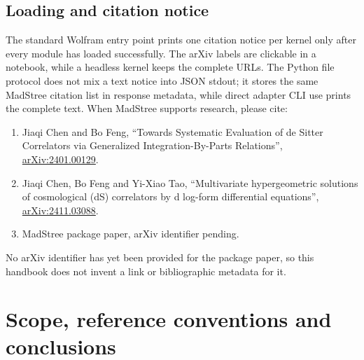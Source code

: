 \documentclass[11pt,a4paper]{article}
\begin{document}
\subsection{Loading and citation notice}

The standard Wolfram entry point prints one citation notice per kernel only after every module
has loaded successfully. The arXiv labels are clickable in a notebook, while a headless kernel
keeps the complete URLs. The Python file protocol does not mix a text notice into JSON stdout;
it stores the same MadStree citation list in response metadata, while direct adapter CLI use
prints the complete text. When MadStree supports research, please cite:
\begin{enumerate}
  \item Jiaqi Chen and Bo Feng, ``Towards Systematic Evaluation of de Sitter Correlators via Generalized Integration-By-Parts Relations'', \href{https://arxiv.org/abs/2401.00129}{arXiv:2401.00129}.
  \item Jiaqi Chen, Bo Feng and Yi-Xiao Tao, ``Multivariate hypergeometric solutions of cosmological (dS) correlators by d log-form differential equations'', \href{https://arxiv.org/abs/2411.03088}{arXiv:2411.03088}.
  \item MadStree package paper, arXiv identifier pending.
\end{enumerate}
No arXiv identifier has yet been provided for the package paper, so this handbook does not
invent a link or bibliographic metadata for it.

\section{Scope, reference conventions and conclusions}
\end{document}

